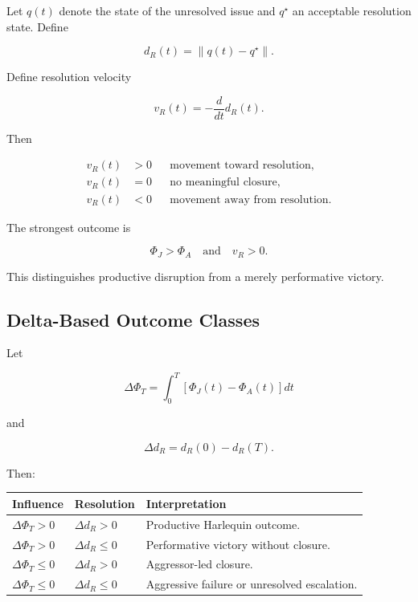 \documentclass[11pt]{article}
\begin{document}
Let $q(t)$ denote the state of the unresolved issue and $q^\star$ an acceptable resolution state. Define

\begin{equation}
d_R(t)
=
\left\|
q(t)-q^\star
\right\|.
\end{equation}

Define resolution velocity

\begin{equation}
v_R(t)
=
-\frac{d}{dt}d_R(t).
\end{equation}

Then

\begin{align}
v_R(t)&>0 &&\text{movement toward resolution},\\
v_R(t)&=0 &&\text{no meaningful closure},\\
v_R(t)&<0 &&\text{movement away from resolution}.
\end{align}

The strongest outcome is

\begin{equation}
\Phi_J>\Phi_A
\quad\text{and}\quad
v_R>0.
\end{equation}

This distinguishes productive disruption from a merely performative victory.

\subsection{Delta-Based Outcome Classes}

Let

\begin{equation}
\Delta\Phi_T
=
\int_0^T
\left[
\Phi_J(t)-\Phi_A(t)
\right]dt
\end{equation}

and

\begin{equation}
\Delta d_R
=
d_R(0)-d_R(T).
\end{equation}

Then:

\begin{longtable}{p{}p{}p{}}
\toprule
\textbf{Influence} & \textbf{Resolution} & \textbf{Interpretation}\\
\midrule
\endhead

$\Delta\Phi_T>0$ & $\Delta d_R>0$ & Productive Harlequin outcome.\\
$\Delta\Phi_T>0$ & $\Delta d_R\leq 0$ & Performative victory without closure.\\
$\Delta\Phi_T\leq 0$ & $\Delta d_R>0$ & Aggressor-led closure.\\
$\Delta\Phi_T\leq 0$ & $\Delta d_R\leq 0$ & Aggressive failure or unresolved escalation.\\

\bottomrule
\end{longtable}
\end{document}
